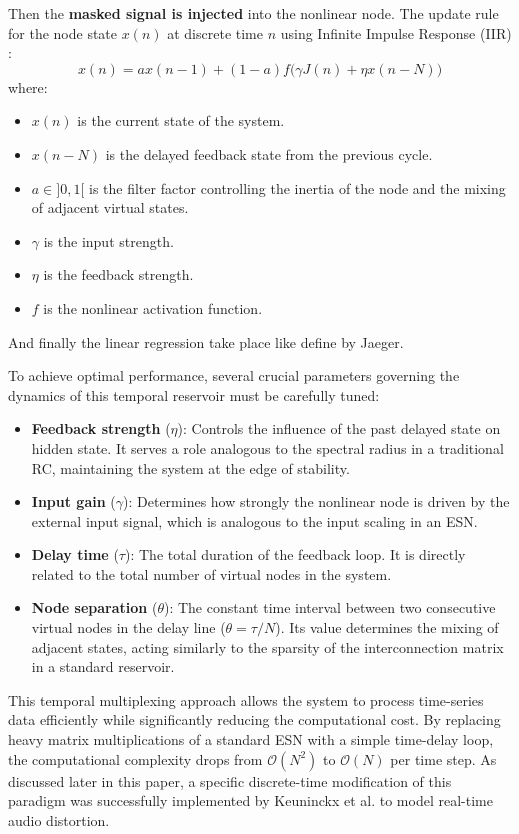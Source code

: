 Then the \textbf{masked signal is injected} into the nonlinear node. The update rule for the node state $x(n)$ at discrete time $n$ using Infinite Impulse Response (IIR) \cite{wyffels2008band}:
\begin{equation}
    x(n) = a x(n-1) + (1-a) f \big( \gamma J(n) + \eta x(n-N) \big)
\end{equation}
where:
\begin{itemize}
    \item $x(n)$ is the current state of the system.
    \item $x(n-N)$ is the delayed feedback state from the previous cycle.
    \item $a \in ]0, 1[$ is the filter factor controlling the inertia of the node and the mixing of adjacent virtual states.
    \item $\gamma$ is the input strength.
    \item $\eta$ is the feedback strength.
    \item $f$ is the nonlinear activation function.
\end{itemize}

And finally the linear regression take place like define by Jaeger\cite{Jaeger10ESN}.

To achieve optimal performance, several crucial parameters governing the dynamics of this temporal reservoir must be carefully tuned:
\begin{itemize}
    \item \textbf{Feedback strength} ($\eta$): Controls the influence of the past delayed state on hidden state. It serves a role analogous to the spectral radius in a traditional RC, maintaining the system at the edge of stability.
    \item \textbf{Input gain} ($\gamma$): Determines how strongly the nonlinear node is driven by the external input signal, which is analogous to the input scaling in an ESN.
    \item \textbf{Delay time} ($\tau$): The total duration of the feedback loop. It is directly related to the total number of virtual nodes in the system.
    \item \textbf{Node separation} ($\theta$): The constant time interval between two consecutive virtual nodes in the delay line ($\theta = \tau/N$). Its value determines the mixing of adjacent states, acting similarly to the sparsity of the interconnection matrix in a standard reservoir.
\end{itemize}

This temporal multiplexing approach allows the system to process time-series data efficiently while significantly reducing the computational cost. By replacing heavy matrix multiplications of a standard ESN with a simple time-delay loop, the computational complexity drops from $\mathcal{O}(N^2)$ to $\mathcal{O}(N)$ \cite{Keuninckx2017RealTime} per time step. As discussed later in this paper, a specific discrete-time modification of this paradigm was successfully implemented by Keuninckx et al. \cite{Keuninckx2017RealTime} to model real-time audio distortion.

